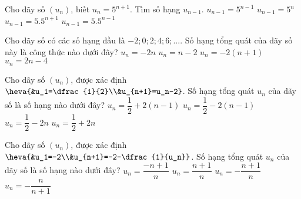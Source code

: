 \begin{ex}%
	Cho dãy số $\left(u_n\right)$, biết $u_n=5^{n+1}$. Tìm số hạng $u_{n-1}$.
	\choice
	{$u_{n-1}=5^{n-1}$}
	{\True $u_{n-1}=5^{n}$}
	{$u_{n-1}=5.5^{n+1}$}
	{$u_{n-1}=5.5^{n-1}$}
\end{ex}
\begin{ex}%
	Cho dãy số có các số hạng đầu là $-2;0;2;4;6;...$. Số hạng tổng quát của dãy số này là công thức nào dưới đây?
	\choice
	{$u_n=-2n$}
	{$u_n=n-2$}
	{$u_n=-2\left(n+1\right)$}
	{\True $u_n=2n-4$}
\end{ex}
\begin{ex}%
	Cho dãy số $\left(u_n\right)$, được xác định $\heva{&u_1=\dfrac{1}{2}\\&u_{n+1}=u_n-2}$. Số hạng tổng quát $u_n$ của dãy số là số hạng nào dưới đây?
	\choice
	{$u_n=\dfrac{1}{2}+2\left(n-1\right)$}
	{\True $u_n=\dfrac{1}{2}-2\left(n-1\right)$}
	{$u_n=\dfrac{1}{2}-2n$}
	{$u_n=\dfrac{1}{2}+2n$}
\end{ex}
\begin{ex}%
	Cho dãy số $\left(u_n\right)$, được xác định $\heva{&u_1=-2\\&u_{n+1}=-2-\dfrac{1}{u_n}}$. Số hạng tổng quát $u_n$ của dãy số là số hạng nào dưới đây?
	\choice
	{$u_n=\dfrac{-n+1}{n}$}
	{$u_n=\dfrac{n+1}{n}$}
	{\True $u_n=-\dfrac{n+1}{n}$}
	{$u_n=-\dfrac{n}{n+1}$}
\end{ex}
